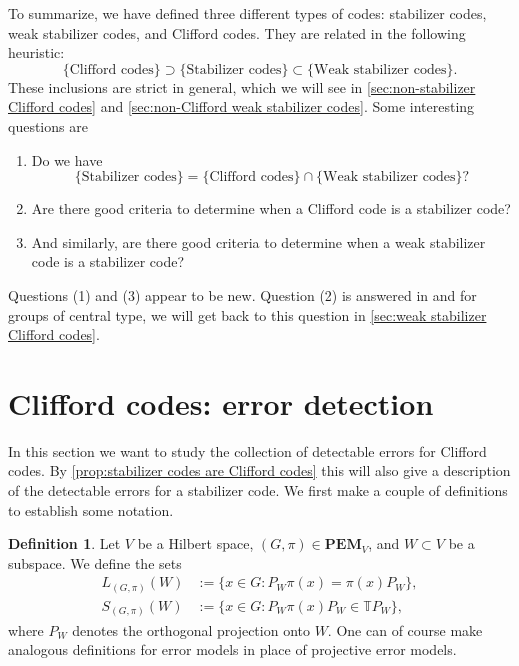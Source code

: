 \documentclass[11pt, oneside, reqno]{amsart}
\newcommand{\bbT}{\mathbb{T}}
\newcommand{\PEM}{\mathbf{PEM}}
\theoremstyle{definition}
\newtheorem{definition}{Definition}[section]
\theoremstyle{plain}
\theoremstyle{remark}
\begin{document}
To summarize, we have defined three different types of codes: stabilizer codes, weak stabilizer codes, and Clifford codes. They are related in the following heuristic:
\begin{equation*}
    \{\text{Clifford codes}\}
    \supset \{\text{Stabilizer codes}\}
    \subset \{\text{Weak stabilizer codes}\}.
\end{equation*}
These inclusions are strict in general, which we will see in \cref{sec:non-stabilizer Clifford codes} and \cref{sec:non-Clifford weak stabilizer codes}. Some interesting questions are
\begin{enumerate}
    \item Do we have
    \begin{equation*}
        \{\text{Stabilizer codes}\} = \{\text{Clifford codes}\} \cap \{\text{Weak stabilizer codes}\}?
    \end{equation*}
    \item Are there good criteria to determine when a Clifford code is a stabilizer code?
    \item And similarly, are there good criteria to determine when a weak stabilizer code is a stabilizer code?
\end{enumerate}
Questions (1) and (3) appear to be new. Question (2) is answered in \cite{KlappeneckerRötteler04} and \cite{GrasslMartínezNicolás10} for groups of central type, we will get back to this question in \cref{sec:weak stabilizer Clifford codes}.

\section{Clifford codes: error detection}\label{sec:error correction}

In this section we want to study the collection of detectable errors for Clifford codes. By \cref{prop:stabilizer codes are Clifford codes} this will also give a description of the detectable errors for a stabilizer code. We first make a couple of definitions to establish some notation.

\begin{definition}\label{def:invariants and stabilizers}
    Let $V$ be a Hilbert space, $(G,\pi) \in \PEM_V$, and $W \subset V$ be a subspace. We define the sets
    \begin{align*}
        L_{(G,\pi)}(W) & := \{ x \in G \colon P_W \pi(x) = \pi(x) P_W \}, \\
        S_{(G,\pi)}(W) & := \{ x \in G \colon P_W \pi(x) P_W \in \bbT P_W \}, 
    \end{align*}
    where $P_W$ denotes the orthogonal projection onto $W$. One can of course make analogous definitions for error models in place of projective error models.
\end{definition}
\end{document}
